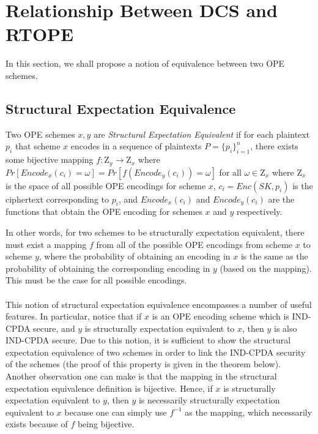 \documentclass[12pt]{article}
\newenvironment{definition}[1][Definition]{\begin{trivlist}
\item[\hskip \labelsep {\bfseries #1}]}{\end{trivlist}}
\begin{document}
\section{Relationship Between DCS and RTOPE}
  In this section, we shall propose a notion of equivalence between two OPE schemes.

  \subsection{Structural Expectation Equivalence} 

\begin{definition} 
  Two OPE schemes $x,y$ are \emph{Structural Expectation Equivalent} if for each plaintext $p_i$ that scheme $x$ encodes in a sequence of plaintexts $P = \{p_i\}_{i=1}^n$, there exists some bijective mapping $f: \mathrm{Z}_y \to \mathrm{Z}_x$ where $Pr[Encode_x(c_i) = \omega] = Pr[f(Encode_y(c_i)) = \omega]$ for all $\omega \in \mathrm{Z}_x$ where $\mathrm{Z}_x$ is the space of all possible OPE encodings for scheme $x$, $c_i = Enc(SK, p_i)$ is the ciphertext corresponding to $p_i$, and $Encode_x(c_i)$ and $Encode_y(c_i)$ are the functions that obtain the OPE encoding for schemes $x$ and $y$ respectively.
\end{definition}

In other words, for two schemes to be structurally expectation equivalent, there must exist a mapping $f$ from all of the possible OPE encodings from scheme $x$ to scheme $y$, where the probability of obtaining an encoding in $x$ is the same as the probability of obtaining the corresponding encoding in $y$ (based on the mapping). This must be the case for all possible encodings. \\ \\
This notion of structural expectation equivalence encompasses a number of useful features. In particular, notice that if $x$ is an OPE encoding scheme which is IND-CPDA secure, and $y$ is structurally expectation equivalent to $x$, then $y$ is also IND-CPDA secure. Due to this notion, it is sufficient to show the structural expectation equivalence of two schemes in order to link the IND-CPDA security of the schemes (the proof of this property is given in the theorem below). Another observation one can make is that the mapping in the structural expectation equivalence definition is bijective. Hence, if $x$ is structurally expectation equivalent to $y$, then $y$ is necessarily structurally expectation equivalent to $x$ because one can simply use $f^{-1}$ as the mapping, which necessarily exists because of $f$ being bijective.
\end{document}

